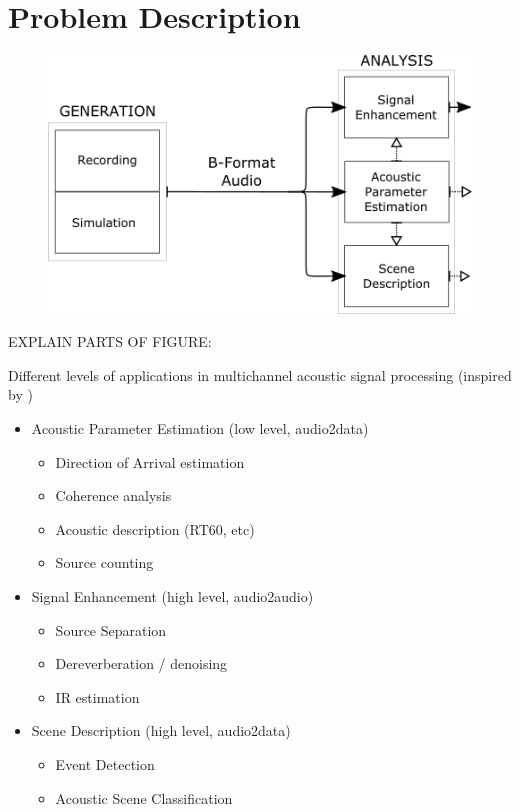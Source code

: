 \section{Problem Description}

\begin{figure}[hbt]
  \includegraphics[width=\textwidth]{Figures/Introduction/SCHEME1.png}
  \caption{}
  \label{fig:scheme1}
\end{figure}

EXPLAIN PARTS OF FIGURE:

Different levels of applications in multichannel acoustic signal processing (inspired by \cite{jarrett2017theory})

\begin{itemize}
	\item Acoustic Parameter Estimation (low level, audio2data)
	\begin{itemize}
		\item Direction of Arrival estimation
		\item Coherence analysis
		\item Acoustic description (RT60, etc)
		\item Source counting
	\end{itemize}

	\item Signal Enhancement  (high level, audio2audio)
	\begin{itemize}
		\item Source Separation
		\item Dereverberation / denoising
		\item IR estimation
	\end{itemize}

	\item Scene Description (high level, audio2data)
	\begin{itemize}
		\item Event Detection
		\item Acoustic Scene Classification
	\end{itemize}
\end{itemize}


